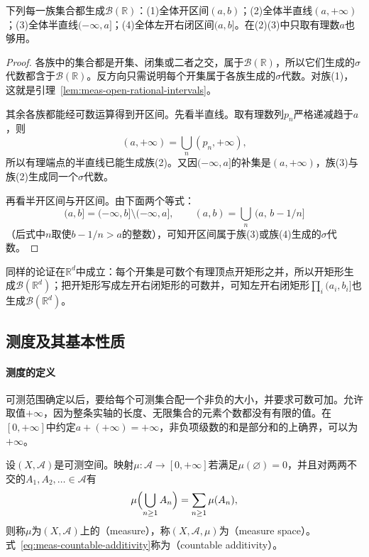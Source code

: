 \begin{theorem}
\label{thm:meas-borel-generators}
下列每一族集合都生成$\mathcal B(\mathbb R)$：(1)全体开区间$(a,b)$；(2)全体半直线$(a,+\infty)$；(3)全体半直线$(-\infty,a]$；(4)全体左开右闭区间$(a,b]$。在(2)(3)中只取有理数$a$也够用。
\end{theorem}

\begin{proof}
各族中的集合都是开集、闭集或二者之交，属于$\mathcal B(\mathbb R)$，所以它们生成的$\sigma$代数都含于$\mathcal B(\mathbb R)$。反方向只需说明每个开集属于各族生成的$\sigma$代数。对族(1)，这就是引理~\ref{lem:meas-open-rational-intervals}。

其余各族都能经可数运算得到开区间。先看半直线。取有理数列$p_n$严格递减趋于$a$，则
\[
 (a,+\infty)=\bigcup_n(p_n,+\infty),
\]
所以有理端点的半直线已能生成族(2)。又因$(-\infty,a]$的补集是$(a,+\infty)$，族(3)与族(2)生成同一个$\sigma$代数。

再看半开区间与开区间。由下面两个等式：
\[
 (a,b]=(-\infty,b]\setminus(-\infty,a],\qquad
 (a,b)=\bigcup_{n}\,(a,\,b-1/n]
\]
（后式中$n$取使$b-1/n>a$的整数），可知开区间属于族(3)或族(4)生成的$\sigma$代数。
\end{proof}

同样的论证在$\mathbb R^d$中成立：每个开集是可数个有理顶点开矩形之并，所以开矩形生成$\mathcal B(\mathbb R^d)$；把开矩形写成左开右闭矩形的可数并，可知左开右闭矩形$\prod_i(a_i,b_i]$也生成$\mathcal B(\mathbb R^d)$。

\subsection{测度及其基本性质}
\label{sec:meas-measures}

\paragraph{测度的定义}
可测范围确定以后，要给每个可测集合配一个非负的大小，并要求可数可加。允许取值$+\infty$，因为整条实轴的长度、无限集合的元素个数都没有有限的值。在$[0,+\infty]$中约定$a+(+\infty)=+\infty$，非负项级数的和是部分和的上确界，可以为$+\infty$。

\begin{definition}[测度]
\label{def:meas-measure}
设$(X,\mathcal A)$是可测空间。映射$\mu:\mathcal A\to[0,+\infty]$若满足$\mu(\varnothing)=0$，并且对两两不交的$A_1,A_2,\dots\in\mathcal A$有
\begin{equation}
 \mu\Bigl(\bigcup_{n\geq1}A_n\Bigr)=\sum_{n\geq1}\mu(A_n),
 \label{eq:meas-countable-additivity}
\end{equation}
则称$\mu$为$(X,\mathcal A)$上的（measure），称$(X,\mathcal A,\mu)$为（measure space）。式~\eqref{eq:meas-countable-additivity}称为（countable additivity）。
\end{definition}

